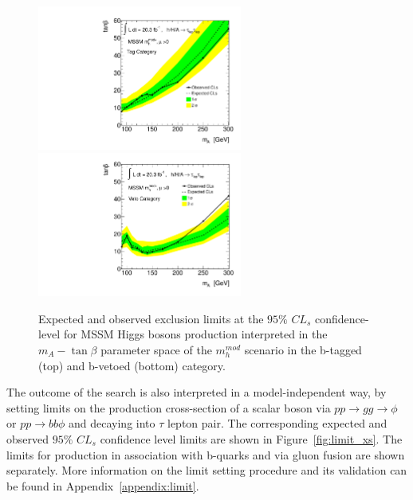 \begin{figure}[tp]
  \centering
  \includegraphics[width=0.6\textwidth]{figure/limits/mhmod_tag.pdf}
  \includegraphics[width=0.6\textwidth]{figure/limits/mhmod_veto.pdf}
  \caption{Expected and observed  exclusion limits at the $95\%$ $CL_s$ confidence-level for MSSM Higgs bosons production 
   interpreted in the  $m_A - \tan\beta$ parameter space of the $m_h^{mod}$ scenario in the   b-tagged (top) and b-vetoed (bottom) category.}
\label{fig:limit_extract_combined2}
\end{figure}


The outcome of the search is also interpreted in a model-independent way, by setting  limits
on the production cross-section of a scalar boson via
$pp \rightarrow gg \rightarrow \phi$ or $pp \rightarrow bb\phi$  and decaying into $\tau$ lepton pair.
The corresponding expected and observed $95\%$ $CL_s$ confidence level  limits are shown in Figure~\ref{fig:limit_xs}.
The limits for production in association with b-quarks and via gluon fusion are shown separately.
More information on the limit setting procedure and its validation can be found in Appendix~\ref{appendix:limit}.

